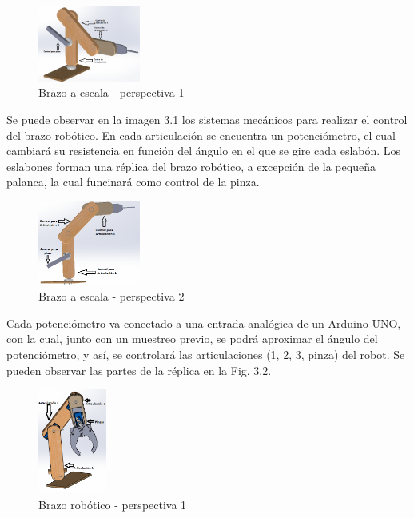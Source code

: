 \documentclass[gra_conf.tex]{subfiles}
\begin{document}
\begin{figure}[h]
  \centering
  \includegraphics[width=0.3\textwidth]{../img/Replica1.png}
  \caption{Brazo a escala - perspectiva 1}
  \label{brazo_replica1}
\end{figure}

Se puede observar en la imagen 3.1 los sistemas mecánicos para realizar
el control del brazo robótico. En cada articulación se encuentra un 
potenciómetro, el cual cambiará su resistencia en función del ángulo
en el  que se gire cada eslabón. Los eslabones forman una réplica del
brazo robótico, a excepción de la pequeña palanca, la cual funcinará
como control de la pinza.

\begin{figure}[h]
  \centering
  \includegraphics[width=0.3\textwidth]{../img/Replica2.png}
  \caption{Brazo a escala - perspectiva 2}
  \label{brazo_replica2}
\end{figure}

Cada potenciómetro va conectado a una entrada analógica de un Arduino UNO, 
con la cual, junto con un muestreo previo, se podrá aproximar el ángulo del 
potenciómetro, y así, se controlará las articulaciones (1, 2, 3, pinza) del 
robot. Se pueden observar las partes de la réplica en la Fig. 3.2.

\begin{figure}[h]
  \centering
  \includegraphics[width=0.2\textwidth]{../img/Brazo1.png}
  \caption{Brazo robótico - perspectiva 1}
  \label{brazo1}
\end{figure}
\end{document}
